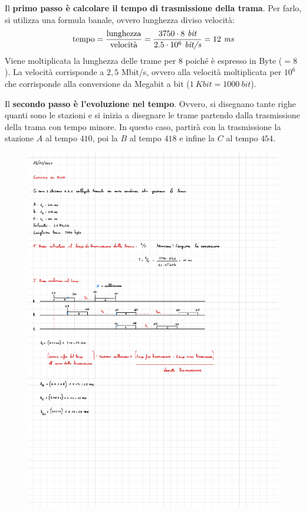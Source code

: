 \documentclass[a4paper]{article}
\begin{document}
	\noindent
	Il \textbf{primo passo è calcolare il tempo di trasmissione della trama}. Per farlo, si utilizza una formula banale, ovvero lunghezza diviso velocità:
	\begin{equation*}
		\text{tempo} = \dfrac{\text{lunghezza}}{\text{velocità}} = \dfrac{3750 \cdot 8 \emph{ bit}}{2.5 \cdot 10^{6} \emph{ bit/s}} = 12 \emph{ ms}
	\end{equation*}
	Viene moltiplicata la lunghezza delle trame per $8$ poiché è espresso in Byte ($= 8$). La velocità corrisponde a $2,5$ Mbit/s, ovvero alla velocità moltiplicata per $10^{6}$ che corrisponde alla conversione da Megabit a bit ($1 \: Kbit = 1000 \: bit$).\newline
	
	\noindent
	Il \textbf{secondo passo è l'evoluzione nel tempo}. Ovvero, si disegnano tante righe quanti sono le stazioni e si inizia a disegnare le trame partendo dalla trasmissione della trama con tempo minore.\newline
	In questo caso, partirà con la trasmissione la stazione $A$ al tempo $410$, poi la $B$ al tempo $418$ e infine la $C$ al tempo $454$.
	\begin{figure}[!htp]
		\centering
		\includegraphics[width=\textwidth]{img/ex1_ALOHA.pdf}
	\end{figure}
	
\end{document}
